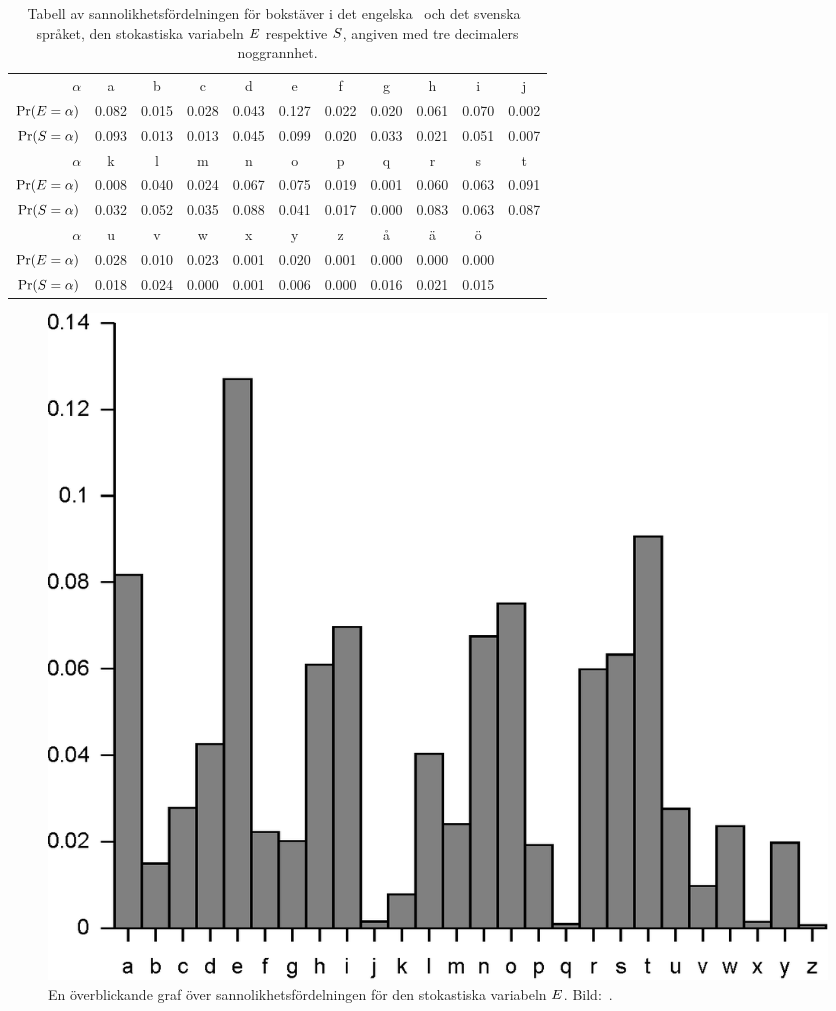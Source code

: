 \begin{table}
  \caption{%
    Tabell av sannolikhetsfördelningen för bokstäver i det 
    engelska~\cite{Stinson2006cta} och det svenska~\cite{Wikipedia2013lf} 
    språket, den stokastiska variabeln \(\relax{E}\) respektive \(\relax{S}\), angiven med 
    tre decimalers noggrannhet.
  }\label{tbl:SannolikhetstabellSpråk}
	\centering
  \begin{tabular}{rcccccccccc}
    \toprule
    \(\alpha\) & a & b & c & d & e & f & g & h & i & j \\
    \(\Pr(\relax{E} = \alpha)\) & 0.082  & 0.015 & 0.028 & 0.043 & 0.127 & 0.022 
    & 0.020 &
    0.061 & 0.070 & 0.002 \\
    \(\Pr(\relax{S} = \alpha)\) & 0.093  & 0.013 & 0.013 & 0.045 & 0.099 & 0.020 
    & 0.033 &
		0.021 & 0.051 & 0.007 \\
    \midrule
    \(\alpha\) & k & l & m & n & o & p & q & r & s & t \\
    \(\Pr(\relax{E} = \alpha)\) & 0.008 & 0.040 & 0.024 & 0.067 & 0.075 & 0.019 
    & 0.001 & 0.060 & 0.063 & 0.091 \\
    \(\Pr(\relax{S} = \alpha)\) & 0.032 & 0.052 & 0.035 & 0.088 & 0.041 & 0.017 
    & 0.000 & 0.083 & 0.063 & 0.087 \\
    \midrule
    \(\alpha\) & u & v & w & x & y & z & å & ä & ö \\
    \(\Pr(\relax{E} = \alpha)\) & 0.028 & 0.010 & 0.023 & 0.001 & 0.020 & 0.001 
    & 0.000 & 0.000 & 0.000 \\
    \(\Pr(\relax{S} = \alpha)\) & 0.018 & 0.024 & 0.000 & 0.001 & 0.006 & 0.000 
    & 0.016 & 0.021 & 0.015 \\
    \bottomrule
  \end{tabular}
\end{table}

\begin{figure}
	\centering
  \includegraphics[width=0.7\linewidth]{figs/english_letter_frequencies.eps}
  \caption{%
    En överblickande graf över sannolikhetsfördelningen för den stokastiska 
    variabeln \(\relax{E}\).
    Bild:~\cite{Wikipedia2013lf}.
  }\label{fig:SannolikhetstabellEngelska}
\end{figure}

